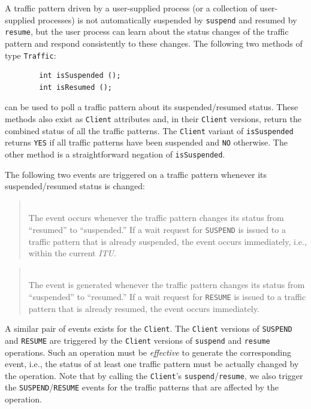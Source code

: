 A traffic pattern driven by a user-supplied process (or a collection of
user-supplied processes) is not automatically suspended by {\tt suspend}
and resumed by {\tt resume}, but the user process can learn about the
status changes of the traffic pattern and respond consistently to these
changes.
The following two methods of type {\tt Traffic}:
\begin{verbatim}
        int isSuspended ();
        int isResumed ();
\end{verbatim}
can be used to poll a traffic pattern about its suspended/resumed status.
These methods also exist as {\tt Client} attributes and, in their {\tt Client}
versions, return the combined status of all the traffic patterns.
The {\tt Client} variant of {\tt isSuspended} returns {\tt YES} if all
traffic patterns have been suspended and {\tt NO} otherwise.
The other method is a straightforward negation of {\tt isSuspended}.

The following two events are triggered on a traffic pattern whenever its 
suspended/resumed status is changed:

\medskip

\begin{quote}
\noindent{}\\ \hspace{0in}
The event occurs whenever the traffic pattern changes its status from
``resumed'' to ``suspended.''
If a wait request for {\tt SUSPEND} is issued to a traffic pattern that is
already suspended, the event occurs immediately, i.e., within the current
{\em ITU}.
\end{quote}

\begin{quote}
\noindent{}\\ \hspace{0in}
The event is generated whenever the traffic pattern changes its status from
``suspended'' to ``resumed.''
If a wait request for {\tt RESUME} is issued to a traffic pattern that is
already resumed, the event occurs immediately.
\end{quote}\medskip

A similar pair of events exists for the {\tt Client}.
The {\tt Client} versions of {\tt SUSPEND} and {\tt RESUME} are triggered
by the {\tt Client} versions of {\tt suspend} and {\tt resume} operations.
Such an operation must be {\em effective\/} to generate the corresponding
event, i.e., the status of at least one traffic pattern must be actually
changed by the operation.
Note that by calling the {\tt Client}'s {\tt suspend}/{\tt resume}, we also
trigger the {\tt SUSPEND}/{\tt RESUME} events for the traffic patterns
that are affected by the operation.

